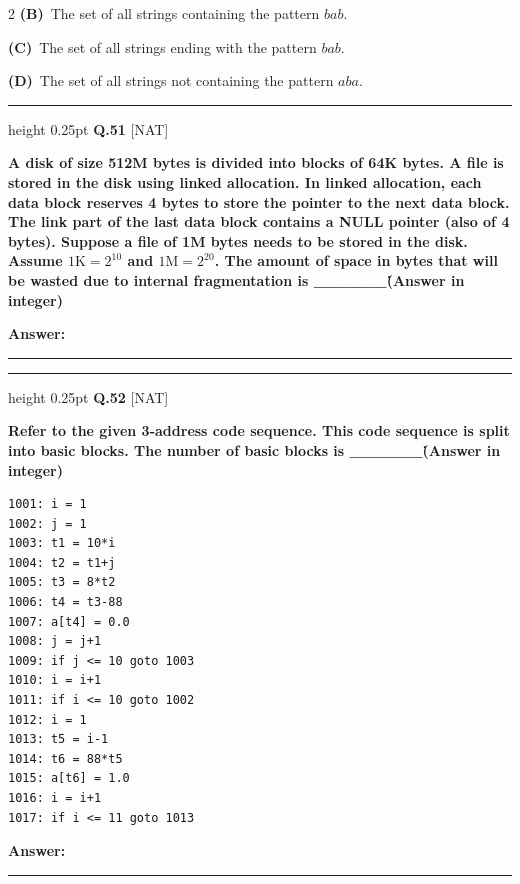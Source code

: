 \documentclass[a4paper,10pt,twoside]{article}
\begin{document}
\begin{multicols}{2}
\textbf{(B)}~The set of all strings containing the pattern $bab$.\par\vspace{2pt}\noindent
\textbf{(C)}~The set of all strings ending with the pattern $bab$.\par\vspace{2pt}\noindent
\textbf{(D)}~The set of all strings not containing the pattern $aba$.
\par\vspace{6pt}\hrule height 0.25pt\vspace{6pt}
\noindent\textbf{Q.51} \hfill {\footnotesize\textsf{[NAT]}}
\par\vspace{2pt}
{\bfseries A disk of size 512M bytes is divided into blocks of 64K bytes. A file is stored in the disk using linked allocation. In linked allocation, each data block reserves 4 bytes to store the pointer to the next data block. The link part of the last data block contains a NULL pointer (also of 4 bytes). Suppose a file of 1M bytes needs to be stored in the disk. Assume $1\text{K} = 2^{10}$ and $1\text{M} = 2^{20}$. The amount of space in bytes that will be wasted due to internal fragmentation is \_\_\_\_\_\_\. (Answer in integer) \par}
\par\vspace{3pt}\noindent\textbf{Answer:} \rule{3.2cm}{0.4pt}
\par\vspace{6pt}\hrule height 0.25pt\vspace{6pt}
\noindent\textbf{Q.52} \hfill {\footnotesize\textsf{[NAT]}}
\par\vspace{2pt}
{\bfseries Refer to the given 3-address code sequence. This code sequence is split into basic blocks. The number of basic blocks is \_\_\_\_\_\_\. (Answer in integer)
\par\smallskip
\begin{verbatim}
1001: i = 1
1002: j = 1
1003: t1 = 10*i
1004: t2 = t1+j
1005: t3 = 8*t2
1006: t4 = t3-88
1007: a[t4] = 0.0
1008: j = j+1
1009: if j <= 10 goto 1003
1010: i = i+1
1011: if i <= 10 goto 1002
1012: i = 1
1013: t5 = i-1
1014: t6 = 88*t5
1015: a[t6] = 1.0
1016: i = i+1
1017: if i <= 11 goto 1013
\end{verbatim} \par}
\par\vspace{3pt}\noindent\textbf{Answer:} \rule{3.2cm}{0.4pt}

\end{multicols}
\end{document}
